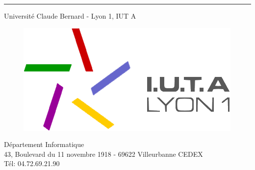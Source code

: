 \begin{titlepage}
\begin{center}
		\vfill

		\hrule
		\begin{center}
			Université Claude Bernard - Lyon 1, IUT A
			\begin{figure}[!htb]
				\begin{center}
					\includegraphics[scale=.25]{Contenu/Images/Logo_IUTA.png}
				\end{center}
			\end{figure}
			Département Informatique\\
			43, Boulevard du 11 novembre 1918 - 69622 Villeurbanne CEDEX\\
			Tél: 04.72.69.21.90
		\end{center}
	\end{center}
\end{titlepage}